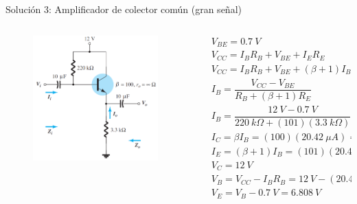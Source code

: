 \documentclass[t,aspectratio=169]{beamer}
\begin{document}
\begin{frame}{Solución 3: Amplificador de colector común (gran señal)}

\vspace{-5mm}
\begin{columns}
\begin{column}{0.4\textwidth}
%
\begin{figure}[H]
    \centering
    \includegraphics[width=\textwidth]{figuras/modelo_re_colector_comun_3.png}
\end{figure}
%
\end{column}
\begin{column}{0.6\textwidth}
%
\begin{align*}
&V_{BE} = 0.7\ V \\
&V_{CC} = I_B R_B + V_{BE} + I_E R_E \\
&V_{CC} = I_B R_B + V_{BE} + (\beta + 1) I_B R_E \\
&I_B = \dfrac{V_{CC} - V_{BE}}{R_B + (\beta + 1) R_E} \\
&I_B = \dfrac{12\ V - 0.7\ V}{220\ k\Omega + (101) (3.3\ k\Omega)} = 20.42\ \mu A \\
&I_C = \beta I_B = (100)(20.42\ \mu A) = 2.042\ mA \\
&I_E = (\beta + 1) I_B = (101)(20.42\ \mu A) = 2.062\ mA \\
&V_C = 12\ V \\
&V_B = V_{CC} - I_B R_B = 12\ V - (20.42\ \mu A)(220\ k\Omega) = 7.508\ V \\
&V_E = V_B - 0.7\ V = 6.808\ V \\
\end{align*}

\end{column}
\end{columns}

\end{frame}
\end{document}
